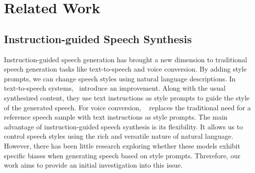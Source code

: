 \section{Related Work}
\subsection{Instruction-guided Speech Synthesis}



Instruction-guided speech generation has brought a new dimension to traditional speech generation tasks like text-to-speech and voice conversion. 
By adding style prompts, we can change speech styles using natural language descriptions.
In text-to-speech systems,~\citet{yang2024instructtts, guo2023prompttts, leng2023prompttts, shimizu2024prompttts++, liu2023promptstyle, ji2024textrolspeech, du2024cosyvoice, lyth2024natural} introduce an improvement. 
Along with the usual synthesized content, they use text instructions as style prompts to guide the style of the generated speech.
For voice conversion, ~\citet{kuan2023towards, niu2024hybridvc} replaces the traditional need for a reference speech sample with text instructions as style prompts.
The main advantage of instruction-guided speech synthesis is its flexibility. 
It allows us to control speech styles using the rich and versatile nature of natural language. 
However, there has been little research exploring whether these models exhibit specific biases when generating speech based on style prompts. 
Threrefore, our work aims to provide an initial investigation into this issue.

